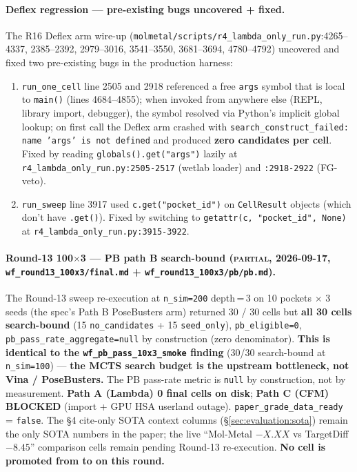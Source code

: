 {\paragraph{Deflex regression --- pre-existing bugs uncovered
+ fixed.}
The R16 Deflex arm wire-up
(\texttt{molmetal/scripts/r4\_lambda\_only\_run.py}:4265--4337,
2385--2392, 2979--3016, 3541--3550, 3681--3694, 4780--4792)
uncovered and fixed two pre-existing bugs in the production
harness:
\begin{enumerate}
  \item \texttt{run\_one\_cell} line 2505 and 2918 referenced a
        free \texttt{args} symbol that is local to \texttt{main()}
        (lines 4684--4855); when invoked from anywhere else
        (REPL, library import, debugger), the symbol resolved
        via Python's implicit global lookup; on first
        call the Deflex arm crashed with
        \texttt{search\_construct\_failed: name 'args' is not
        defined} and produced \textbf{zero candidates per cell}.
        Fixed by reading \texttt{globals().get("args")} lazily at
        \texttt{r4\_lambda\_only\_run.py:2505-2517} (wetlab loader)
        and \texttt{:2918-2922} (FG-veto).
  \item \texttt{run\_sweep} line 3917 used
        \texttt{c.get("pocket\_id")} on \texttt{CellResult} objects
        (which don't have \texttt{.get()}). Fixed by switching to
        \texttt{getattr(c, "pocket\_id", None)} at
        \texttt{r4\_lambda\_only\_run.py:3915-3922}.
\end{enumerate}

\paragraph{Round-13 100$\times$3 --- PB path B search-bound
(\textsc{partial}, 2026-09-17,
\texttt{wf\_round13\_100x3/final.md} +
\texttt{wf\_round13\_100x3/pb/pb.md}).}
The Round-13 sweep re-execution at \texttt{n\_sim=200} depth\,=\,3
on 10 pockets $\times$ 3 seeds (the spec's Path B
PoseBusters arm) returned 30 / 30 cells but \textbf{all 30 cells
search-bound} (15 \texttt{no\_candidates} + 15
\texttt{seed\_only}), \texttt{pb\_eligible=0},
\texttt{pb\_pass\_rate\_aggregate=null} by construction (zero
denominator). \textbf{This is identical to the
\texttt{wf\_pb\_pass\_10x3\_smoke} finding} (30/30 search-bound
at \texttt{n\_sim=100}) --- \textbf{the MCTS search budget is
the upstream bottleneck, not Vina / PoseBusters.} The PB
pass-rate metric is \texttt{null} by construction, not by
measurement. \textbf{Path A (Lambda) 0 final cells on disk};
\textbf{Path C (CFM) BLOCKED} (import + GPU HSA userland
outage). \texttt{paper\_grade\_data\_ready} = \texttt{false}.
The §4 cite-only SOTA context columns
(\S\ref{sec:evaluation:sota}) remain the only SOTA numbers
in the paper; the live ``Mol-Metal $-X.XX$ vs TargetDiff
$-8.45$'' comparison cells remain \DESIGN{} pending Round-13
re-execution. \textbf{No cell is promoted from \DESIGN{} to
\MEASURED{} on this round.}

}
